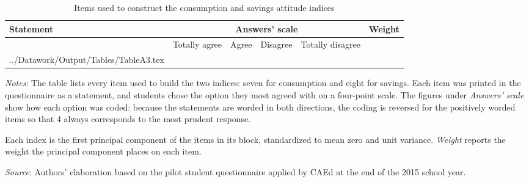 \documentclass[
	article,			%
	12pt,				%
	oneside,			%
	a4paper,			%
	]{article}
\makeatletter
\newcommand{\tablefragment}[1]{\@@input #1 }
\makeatother
\begin{document}
\begin{table}[h!]
  \centering
  \fontsize{8}{10} \selectfont
\begin{threeparttable}
  \caption{Items used to construct the consumption and savings attitude indices}\label{tab:cs_index}%
     \setlength{\tabcolsep}{4pt}%
     \begin{tabular}{p{7.4cm}ccccc}
    \textbf{Statement} & \multicolumn{4}{c}{\textbf{Answers' scale}} & \textbf{Weight} \\
    \midrule
          & Totally agree & Agree & Disagree & Totally disagree &  \\
\tablefragment{../Datawork/Output/Tables/TableA3.tex}
    \bottomrule
    \end{tabular}%
\begin{tablenotes}
\fontsize{8}{9}\selectfont
\item \textit{Notes}: The table lists every item used to build the two indices: seven for consumption and eight for savings. Each item was printed in the questionnaire as a statement, and students chose the option they most agreed with on a four-point scale. The figures under \textit{Answers' scale} show how each option was coded: because the statements are worded in both directions, the coding is reversed for the positively worded items so that 4 always corresponds to the most prudent response.

\item Each index is the first principal component of the items in its block, standardized to mean zero and unit variance. \textit{Weight} reports the weight the principal component places on each item. 

\item \textit{Source}: Authors' elaboration based on the pilot student questionnaire applied by CAEd at the end of the 2015 school year.
\end{tablenotes}
\end{threeparttable}
\end{table}%
\end{document}
